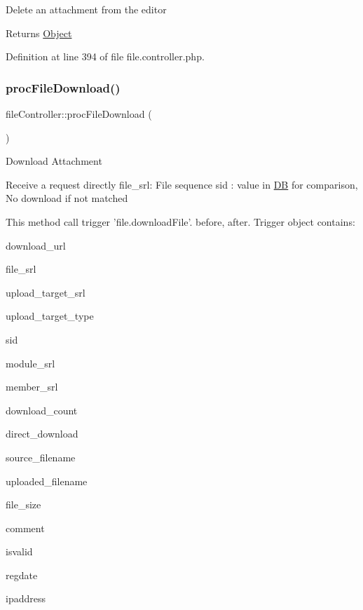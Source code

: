 Delete an attachment from the editor

\begin{DoxyReturn}{Returns}
\hyperlink{classObject}{Object} 
\end{DoxyReturn}


Definition at line 394 of file file.\+controller.\+php.

\mbox{\label{classfileController_a11ac8c819e791e103ed113b3927975af}} 
\subsubsection{\texorpdfstring{proc\+File\+Download()}{procFileDownload()}}
{\footnotesize\ttfamily file\+Controller\+::proc\+File\+Download (\begin{DoxyParamCaption}{ }\end{DoxyParamCaption})}

Download Attachment


\begin{DoxyPre}
Receive a request directly
file\_srl: File sequence
sid : value in \hyperlink{classDB}{DB} for comparison, No download if not matched\end{DoxyPre}



\begin{DoxyPre}This method call trigger 'file.downloadFile'.
before, after.
Trigger object contains:
\begin{DoxyItemize}
\item download\_url
\item file\_srl
\item upload\_target\_srl
\item upload\_target\_type
\item sid
\item module\_srl
\item member\_srl
\item download\_count
\item direct\_download
\item source\_filename
\item uploaded\_filename
\item file\_size
\item comment
\item isvalid
\item regdate
\item ipaddress

\end{DoxyItemize}\end{DoxyPre}




